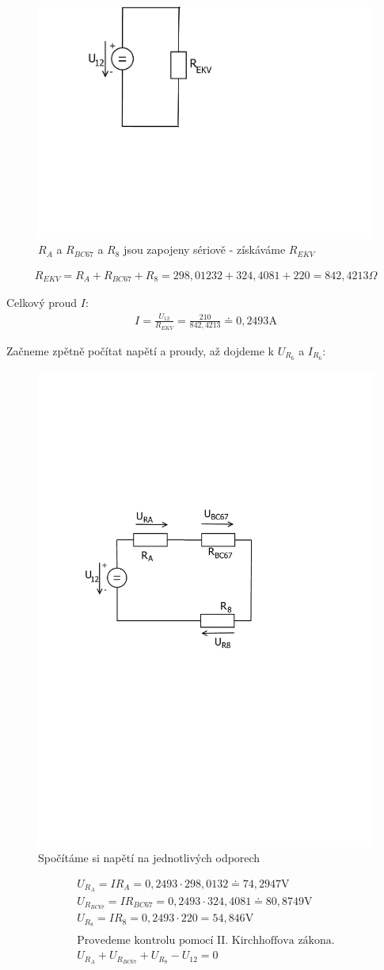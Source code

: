 	\begin{figure}[H]
		\center\includegraphics[width=0.3\linewidth]{obr/1_7}
		\caption*{$R_A$ a $R_{BC67}$ a $R_8$ jsou zapojeny sériově - získáváme $R_{EKV}$}
	\end{figure}
	\begin{gather*}
		R_{EKV} = R_{A} + R_{BC67} + R_8 = 298,01232 + 324,4081 + 220 = 842,4213 \Omega
	\end{gather*}

	Celkový proud $I$:
	\begin{gather*}
		I = \frac{U_{12}}{R_{EKV}} = \frac{210}{842,4213} \doteq 0,2493 \text{A}
	\end{gather*}

	Začneme zpětně počítat napětí a proudy, až dojdeme k $U_{R_6}$ a $I_{R_6}$:

	\begin{figure}[H]
		\center\includegraphics[width=0.6\linewidth]{obr/1_8}
		\caption*{Spočítáme si napětí na jednotlivých odporech}
	\end{figure}
	\begin{gather*}
		U_{R_A} = {I R_A} = {0,2493\cdot 298,0132} \doteq 74,2947  \text{V} \\
		U_{R_{BC67}} = {I R_{BC67}} = {0,2493 \cdot 324,4081} \doteq 80,8749  \text{V} \\
		U_{R_8} = {I R_8} = {0,2493 \cdot 220} = 54,846  \text{V} \\
		\\
		\text{Provedeme kontrolu pomocí II. Kirchhoffova zákona.}  \\
		U_{R_A} + U_{R_{BC67}} + U_{R_8} - U_{12} =  0 \\
	\end{gather*}


